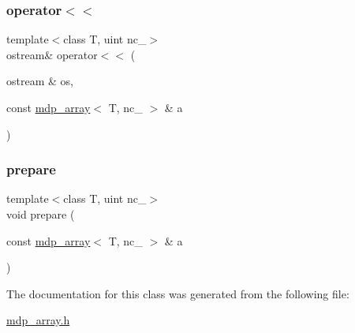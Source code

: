 \mbox{\label{classmdp__array_a5b84c698961f9276308a57923daf4458}} 
\subsubsection{\texorpdfstring{operator$<$$<$}{operator<<}}
{\footnotesize\ttfamily template$<$class T, uint nc\+\_\+$>$ \\
ostream\& operator$<$$<$ (\begin{DoxyParamCaption}\item[{ostream \&}]{os,  }\item[{const \hyperlink{classmdp__array}{mdp\+\_\+array}$<$ T, nc\+\_\+ $>$ \&}]{a }\end{DoxyParamCaption})\hspace{0.3cm}{\ttfamily [friend]}}

\mbox{\label{classmdp__array_a7c12113e8b61f3906ff4d15a6cc10fe2}} 
\subsubsection{\texorpdfstring{prepare}{prepare}}
{\footnotesize\ttfamily template$<$class T, uint nc\+\_\+$>$ \\
void prepare (\begin{DoxyParamCaption}\item[{const \hyperlink{classmdp__array}{mdp\+\_\+array}$<$ T, nc\+\_\+ $>$ \&}]{a }\end{DoxyParamCaption})\hspace{0.3cm}{\ttfamily [friend]}}



The documentation for this class was generated from the following file\+:\begin{DoxyCompactItemize}
\item 
\hyperlink{mdp__array_8h}{mdp\+\_\+array.\+h}\end{DoxyCompactItemize}

